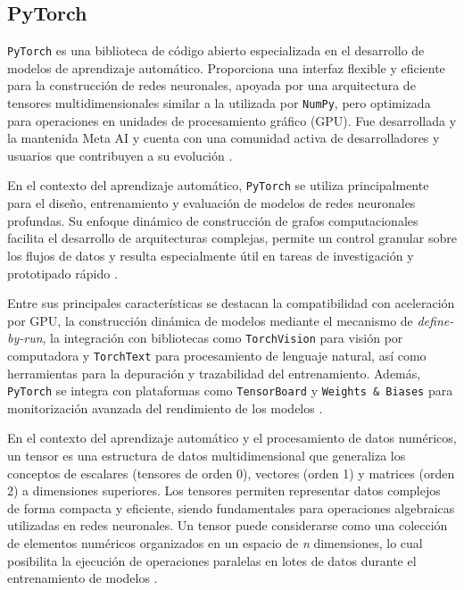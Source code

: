 \subsection{PyTorch}
\texttt{PyTorch} es una biblioteca de código abierto especializada en el desarrollo de modelos de aprendizaje automático. Proporciona una interfaz flexible y eficiente para la construcción de redes neuronales, apoyada por una arquitectura de tensores multidimensionales similar a la utilizada por \texttt{NumPy}, pero optimizada para operaciones en unidades de procesamiento gráfico (GPU). Fue desarrollada y la mantenida Meta AI y cuenta con una comunidad activa de desarrolladores y usuarios que contribuyen a su evolución \cite{paszke2019pytorch}.

En el contexto del aprendizaje automático, \texttt{PyTorch} se utiliza principalmente para el diseño, entrenamiento y evaluación de modelos de redes neuronales profundas. Su enfoque dinámico de construcción de grafos computacionales facilita el desarrollo de arquitecturas complejas, permite un control granular sobre los flujos de datos y resulta especialmente útil en tareas de investigación y prototipado rápido \cite{paszke2017automatic}.

Entre sus principales características se destacan la compatibilidad con aceleración por GPU, la construcción dinámica de modelos mediante el mecanismo de \textit{define-by-run}, la integración con bibliotecas como \texttt{TorchVision} para visión por computadora y \texttt{TorchText} para procesamiento de lenguaje natural, así como herramientas para la depuración y trazabilidad del entrenamiento. Además, \texttt{PyTorch} se integra con plataformas como \texttt{TensorBoard} y \texttt{Weights \& Biases} para monitorización avanzada del rendimiento de los modelos \cite{gross2021pytorchbook}.

En el contexto del aprendizaje automático y el procesamiento de datos numéricos, un tensor es una estructura de datos multidimensional que generaliza los conceptos de escalares (tensores de orden 0), vectores (orden 1) y matrices (orden 2) a dimensiones superiores. Los tensores permiten representar datos complejos de forma compacta y eficiente, siendo fundamentales para operaciones algebraicas utilizadas en redes neuronales. Un tensor puede considerarse como una colección de elementos numéricos organizados en un espacio de \textit{n} dimensiones, lo cual posibilita la ejecución de operaciones paralelas en lotes de datos durante el entrenamiento de modelos \cite{goodfellow2016deep}.

